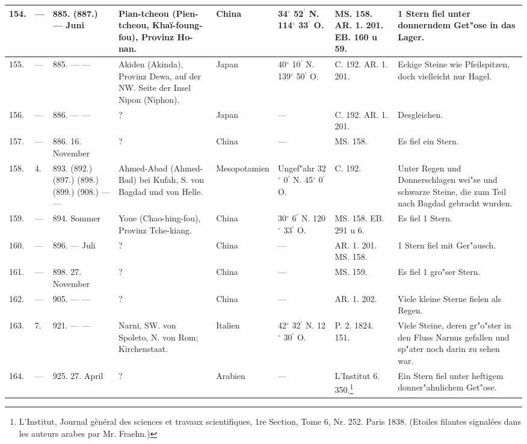 \documentclass[a4paper, 8pt, oneside, polutonikogreek, german]{article}
\begin{document}
\begin{center}
\begin{longtable}{| p{4mm} | p{2mm} | p{15mm} | p{25mm} | p{16mm} | p{12mm} | p{13mm} | p{20mm} |}
        154. & --- & 885. (887.) --- Juni & Pian-tcheou (Pien-tcheou, Khaï-foung-fou), Provinz Ho-nan. & China & 34$^\circ$ 52$^\prime$ N. 114$^\circ$ 33$^\prime$ O. & MS. 158. AR. 1. 201. EB. 160 u 59. & 1 Stern fiel unter donnerndem Get"ose in das Lager. \\ \hline
        155. & --- & 885. --- --- & Akiden (Akinda), Provinz Dewa, auf der NW. Seite der Insel Nipon (Niphon). & Japan & 40$^\circ$ 10$^\prime$ N. 139$^\circ$ 50$^\prime$ O. & C. 192. AR. 1. 201. & Eckige Steine wie Pfeilspitzen, doch vielleicht nur Hagel. \\ \hline
        156. & --- & 886. --- --- & ? & Japan & --- & C. 192. AR. 1. 201. & Desgleichen. \\ \hline
        157. & --- & 886. 16. November & ? & China & --- & MS. 158. & Es fiel ein Stern. \\ \hline
        158. & 4. & 893. (892.) (897.) (898.) (899.) (908.) --- --- & Ahmed-Abad (Ahmed-Bad) bei Kufah, S. von Bagdad und von Helle. & Mesopotamien & Ungef"ahr 32$^\circ$ 0$^\prime$ N. 45$^\circ$ 0$^\prime$ O. & C. 192. & Unter Regen und Donnerschlagen wei"se und schwarze Steine, die zum Teil nach Bagdad gebracht wurden. \\ \hline
        159. & --- & 894. Sommer & Youe (Chao-hing-fou), Provinz Tche-kiang. & China & 30$^\circ$ 6$^\prime$ N. 120$^\circ$ 33$^\prime$ O. & MS. 158. EB. 291 u 6. & Es fiel 1 Stern. \\ \hline
        160. & --- & 896. --- Juli & ? & China & --- & AR. 1. 201. MS. 158. & 1 Stern fiel mit Ger"ausch. \\ \hline
        161. & --- & 898. 27. November & ? & China & --- & MS. 159. & Es fiel 1 gro"ser Stern. \\ \hline
        162. & --- & 905. --- --- & ? & China & --- & AR. 1. 202. & Viele kleine Sterne fielen als Regen. \\ \hline
        163. & 7. & 921. --- --- & Narni, SW. von Spoleto, N. von Rom; Kirchenstaat. & Italien & 42$^\circ$ 32$^\prime$ N. 12$^\circ$ 30$^\prime$ O. & P. 2. 1824. 151. & Viele Steine, deren gr"o"ster in den Fluss Narnus gefallen und sp"ater noch darin zu sehen war. \\ \hline
        164. & --- & 925. 27. April & ? & Arabien & --- & L’Institut 6. 350.\footnote{L'Institut, Journal gènéral des sciences et travaux scientifiques, 1re Section, Tome 6, Nr. 252. Paris 1838. (Etoiles filantes signalées dans les auteurs arabes par Mr. Fraehn.)} & Ein Stern fiel unter heftigem donner"ahnlichem Get"ose. \\ \hline

\end{longtable}
\end{center}
\end{document}
